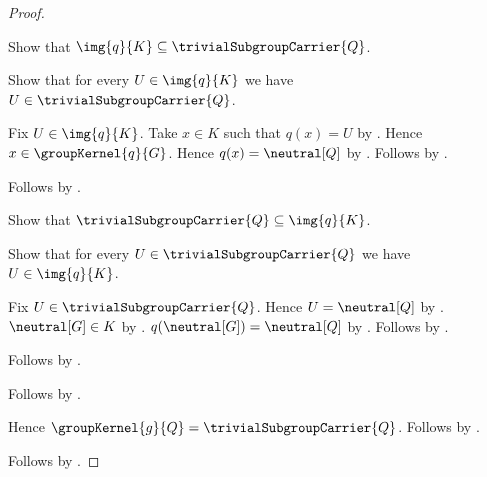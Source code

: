 \begin{proof}
\begin{subproof}
        \begin{subproof}
            Show that $\img{q}{K}\subseteq\trivialSubgroupCarrier{Q}$.
            \begin{subproof}
                Show that for every $U\in\img{q}{K}$ we have
                    $U\in\trivialSubgroupCarrier{Q}$.
                \begin{subproof}
                    Fix $U\in\img{q}{K}$.
                    Take $x\in K$ such that $q(x)=U$ by
                        .
                    Hence $x\in\groupKernel{q}{G}$.
                    Hence $q(x)=\neutral[Q]$ by
                        .
                    Follows by
                        .
                \end{subproof}
                Follows by .
            \end{subproof}
            Show that $\trivialSubgroupCarrier{Q}\subseteq\img{q}{K}$.
            \begin{subproof}
                Show that for every $U\in\trivialSubgroupCarrier{Q}$
                    we have $U\in\img{q}{K}$.
                \begin{subproof}
                    Fix $U\in\trivialSubgroupCarrier{Q}$.
                    Hence $U=\neutral[Q]$ by
                        .
                    $\neutral[G]\in K$ by
                        .
                    $q(\neutral[G])=\neutral[Q]$ by
                        .
                    Follows by .
                \end{subproof}
                Follows by .
            \end{subproof}
            Follows by .
        \end{subproof}
        Hence
            $\groupKernel{g}{Q}=\trivialSubgroupCarrier{Q}$.
        Follows by
            .
    \end{subproof}
    Follows by \auto.
\end{proof}

